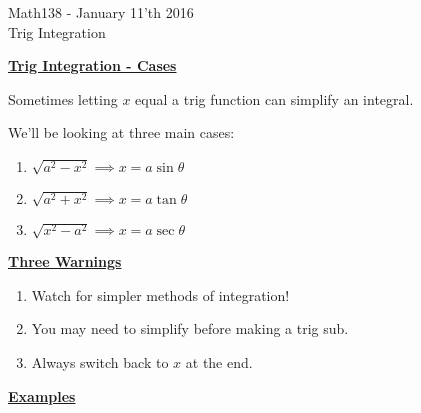 \documentclass{letter}
\newcommand{\0}[1]{\begin{bmatrix}#1\end{bmatrix}}
\newcommand{\h}[1]{\underline{\textbf{#1}}}
\begin{document}
	\begin{center}
		\LARGE Math138 - January 11'th 2016\\
		\large Trig Integration
	\end{center}
	\vspace{0.25 in}
	
	\h{Trig Integration - Cases}
	
	Sometimes letting $x$ equal a trig function can simplify an integral.
	
	We'll be looking at three main cases:
	
	\begin{enumerate}[1)]
		\item $\sqrt{a^2 - x^2} \implies x = a\sin \theta$
		\item $\sqrt{a^2 + x^2} \implies x = a\tan \theta$
		\item $\sqrt{x^2 - a^2} \implies x = a\sec \theta$
	\end{enumerate}
	
	\h{Three Warnings}
	
	\begin{enumerate}[1)]
		\item Watch for simpler methods of integration!
		\item You may need to simplify before making a trig sub.
		\item Always switch back to $x$ at the end.
	\end{enumerate}
	
	\h{Examples}
	
\end{document}
